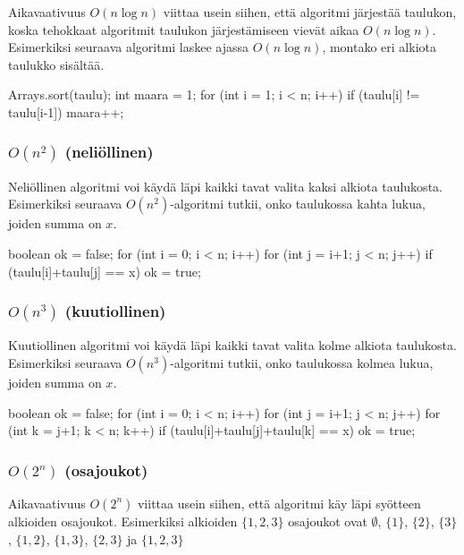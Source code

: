 Aikavaativuus $O(n \log n)$ viittaa usein siihen,
että algoritmi järjestää taulukon,
koska tehokkaat algoritmit taulukon järjestämiseen
vievät aikaa $O(n \log n)$.
Esimerkiksi seuraava algoritmi laskee ajassa
$O(n \log n)$, montako eri alkiota taulukko sisältää.

\begin{code}
Arrays.sort(taulu);
int maara = 1;
for (int i = 1; i < n; i++) {
    if (taulu[i] != taulu[i-1]) maara++;
}
\end{code}

\subsubsection{$O(n^2)$ (neliöllinen)}

Neliöllinen algoritmi voi käydä läpi kaikki tavat valita
kaksi alkiota taulukosta.
Esimerkiksi seuraava $O(n^2)$-algoritmi tutkii, onko taulukossa
kahta lukua, joiden summa on $x$.

\begin{code}
boolean ok = false;
for (int i = 0; i < n; i++) {
    for (int j = i+1; j < n; j++) {
        if (taulu[i]+taulu[j] == x) ok = true;
    }
}
\end{code}

\subsubsection{$O(n^3)$ (kuutiollinen)}

Kuutiollinen algoritmi voi käydä läpi kaikki tavat valita
kolme alkiota taulukosta.
Esimerkiksi seuraava $O(n^3)$-algoritmi tutkii, onko taulukossa
kolmea lukua, joiden summa on $x$.

\begin{code}
boolean ok = false;
for (int i = 0; i < n; i++) {
    for (int j = i+1; j < n; j++) {
        for (int k = j+1; k < n; k++) {
            if (taulu[i]+taulu[j]+taulu[k] == x) ok = true;
        }
    }
}
\end{code}

\subsubsection{$O(2^n)$ (osajoukot)}

Aikavaativuus $O(2^n)$ viittaa usein siihen,
että algoritmi käy läpi syötteen alkioiden osajoukot.
Esimerkiksi alkioiden $\{1,2,3\}$ osajoukot ovat
$\emptyset$, $\{1\}$, $\{2\}$, $\{3\}$, $\{1,2\}$, $\{1,3\}$, $\{2,3\}$ ja $\{1,2,3\}$

